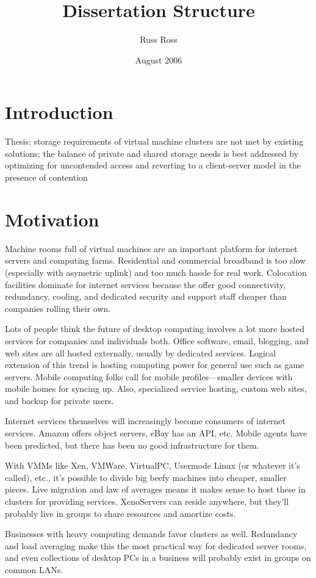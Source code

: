 \documentclass[a4paper,12pt]{article}
\title{Dissertation Structure}
\author{Russ Ross}
\date{August 2006}
\begin{document}
\maketitle

\section{Introduction}
Thesis: storage requirements of virtual machine clusters are not met by existing solutions; the balance of private and shared storage needs is best addressed by optimizing for uncontended access and reverting to a client-server model in the presence of contention

\section{Motivation}
Machine rooms full of virtual machines are an important platform for internet servers and computing farms. Residential and commercial broadband is too slow (especially with asymetric uplink) and too much hassle for real work. Colocation facilities dominate for internet services because the offer good connectivity, redundancy, cooling, and dedicated security and support staff cheaper than companies rolling their own.

Lots of people think the future of desktop computing involves a lot more hosted services for companies and individuals both. Office software, email, blogging, and web sites are all hosted externally, usually by dedicated services. Logical extension of this trend is hosting computing power for general use such as game servers. Mobile computing folks call for mobile profiles---smaller devices with mobile homes for syncing up. Also, specialized service hosting, custom web sites, and backup for private users.

Internet services themselves will increasingly become consumers of internet services. Amazon offers object servers, eBay has an API, etc. Mobile agents have been predicted, but there has been no good infrastructure for them.

With VMMs like Xen, VMWare, VirtualPC, Usermode Linux (or whatever it's called), etc., it's possible to divide big beefy machines into cheaper, smaller pieces. Live migration and law of averages means it makes sense to host these in clusters for providing services. XenoServers can reside anywhere, but they'll probably live in groups to share resources and amortize costs.

Businesses with heavy computing demands favor clusters as well. Redundancy and load averaging make this the most practical way for dedicated server rooms, and even collections of desktop PCs in a business will probably exist in groups on common LANs.
\end{document}
